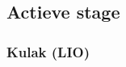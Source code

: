 \begin{landscape}
\newpage
\subsection{Actieve stage}
		\subsubsection{Kulak (LIO)}
		
		\begin{minipage}[t][10cm][t]{0.5\textwidth}
			
		\end{minipage}

\end{landscape}
